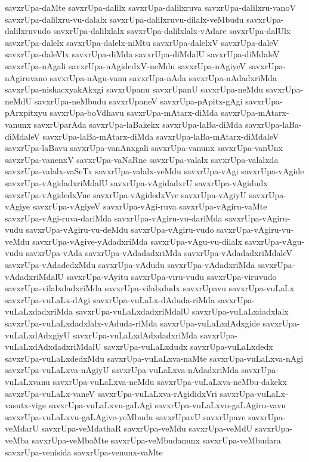 {savxrUpa-daMte
savxrUpa-dalilx
savxrUpa-dalilxruva
savxrUpa-dalilxru-vanoV
savxrUpa-dalilxru-vu-dalalx
savxrUpa-dalilxruvu-dilalx-veMbudu
savxrUpa-dalilxruvudo
savxrUpa-dalilxlalx
savxrUpa-dalilxlalx-vAdare
savxrUpa-dalUlx
savxrUpa-dalelx
savxrUpa-dalelx-niMtu
savxrUpa-dalelxV
savxrUpa-daleV
savxrUpa-daleVlx
savxrUpa-diMda
savxrUpa-diMdalU
savxrUpa-diMdaleV
savxrUpa-nAgali
savxrUpa-nAgidedxV-neMdu
savxrUpa-nAgiyeV
savxrUpa-nAgiruvano
savxrUpa-nAgu-vanu
savxrUpa-nAda
savxrUpa-nAdadxriMda
savxrUpa-nishacxyakAkxgi
savxrUpanu
savxrUpanU
savxrUpa-neMdu
savxrUpa-neMdU
savxrUpa-neMbudu
savxrUpaneV
savxrUpa-pApitx-gAgi
savxrUpa-pArxpitxyu
savxrUpa-boVdhavu
savxrUpa-mAtarx-diMda
savxrUpa-mAtarx-vanunx
savxrUparAda
savxrUpa-laBakekx
savxrUpa-laBa-diMda
savxrUpa-laBa-diMdaleV
savxrUpa-laBa-mAtarx-diMda
savxrUpa-laBa-mAtarx-diMdaleV
savxrUpa-laBavu
savxrUpa-vanAnxgali
savxrUpa-vanunx
savxrUpa-vanUnx
savxrUpa-vanenxV
savxrUpa-vaNaRne
savxrUpa-valalx
savxrUpa-valalxda
savxrUpa-valalx-vaSeTx
savxrUpa-valalx-veMdu
savxrUpa-vAgi
savxrUpa-vAgide
savxrUpa-vAgidadxriMdalU
savxrUpa-vAgidadxrU
savxrUpa-vAgidudx
savxrUpa-vAgidedxVne
savxrUpa-vAgidedxVve
savxrUpa-vAgiyU
savxrUpa-vAgiye
savxrUpa-vAgiyeV
savxrUpa-vAgi-ruva
savxrUpa-vAgiru-vaMte
savxrUpa-vAgi-ruva-dariMda
savxrUpa-vAgiru-vu-dariMda
savxrUpa-vAgiru-vudu
savxrUpa-vAgiru-vu-deMdu
savxrUpa-vAgiru-vudo
savxrUpa-vAgiru-vu-veMdu
savxrUpa-vAgive-yAdadxriMda
savxrUpa-vAgu-vu-dilalx
savxrUpa-vAgu-vudu
savxrUpa-vAda
savxrUpa-vAdadadxriMda
savxrUpa-vAdadadxriMdaleV
savxrUpa-vAdadedxMdu
savxrUpa-vAdudu
savxrUpa-vAdadxriMda
savxrUpa-vAdadxriMdalU
savxrUpa-vAyitu
savxrUpa-viru-vudu
savxrUpa-viruvudo
savxrUpa-vilalxdadxriMda
savxrUpa-vilalxdudx
savxrUpavu
savxrUpa-vuLaLx
savxrUpa-vuLaLx-dAgi
savxrUpa-vuLaLx-dAduda-riMda
savxrUpa-vuLaLxdadxriMda
savxrUpa-vuLaLxdadxriMdalU
savxrUpa-vuLaLxdadxlalx
savxrUpa-vuLaLxdadxlalx-vAduda-riMda
savxrUpa-vuLaLxdAdxgide
savxrUpa-vuLaLxdAdxgiyU
savxrUpa-vuLaLxdAdxdadxriMda
savxrUpa-vuLaLxdAdxdadxriMdalU
savxrUpa-vuLaLxdudx
savxrUpa-vuLaLxdedx
savxrUpa-vuLaLxdedxMdu
savxrUpa-vuLaLxva-naMte
savxrUpa-vuLaLxva-nAgi
savxrUpa-vuLaLxva-nAgiyU
savxrUpa-vuLaLxva-nAdadxriMda
savxrUpa-vuLaLxvanu
savxrUpa-vuLaLxva-neMdu
savxrUpa-vuLaLxva-neMbu-dakekx
savxrUpa-vuLaLx-vaneV
savxrUpa-vuLaLxva-rAgididxVri
savxrUpa-vuLaLx-vasutx-vige
savxrUpa-vuLaLxvu-gaLAgi
savxrUpa-vuLaLxvu-gaLAgiru-vavu
savxrUpa-vuLaLxvu-gaLAgive-yeMbudu
savxrUpavU
savxrUpave
savxrUpa-veMdarU
savxrUpa-veMdathaR
savxrUpa-veMdu
savxrUpa-veMdU
savxrUpa-veMba
savxrUpa-veMbaMte
savxrUpa-veMbudanunx
savxrUpa-veMbudara
savxrUpa-venisida
savxrUpa-venunx-vaMte
}
